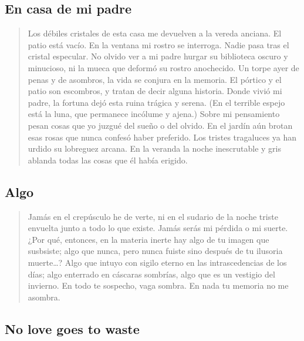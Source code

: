 \documentclass[a4paper, 12pt]{article}
\begin{document}
\pagebreak
\subsection{En casa de mi padre}

\begin{verse}
   Los débiles cristales de esta casa 
   me devuelven a la vereda anciana.
   El patio está vacío. En la ventana 
   mi rostro se interroga. Nadie pasa 
   tras el cristal especular. No olvido 
   ver a mi padre hurgar su biblioteca
   oscuro y minucioso, ni la mueca 
   que deformó su rostro anochecido.
   Un torpe ayer de penas y de asombros,
   la vida se conjura en la memoria.
   El pórtico y el patio son escombros,
   y tratan de decir alguna historia.
   Donde vivió mi padre, la fortuna 
   dejó esta ruina trágica y serena.
   (En el terrible espejo está la luna,
   que permanece incólume y ajena.)
   Sobre mi pensamiento pesan cosas 
   que yo juzgué del sueño o del olvido.
   En el jardín aún brotan esas rosas 
   que nunca confesó haber preferido.
   Los tristes tragaluces ya han urdido
   su lobreguez arcana. En la veranda 
   la noche inescrutable y gris ablanda 
   todas las cosas que él había erigido.
\end{verse}

\pagebreak
\subsection{Algo}

\begin{verse}
    
Jamás en el crepúsculo he de verte,
ni en el sudario de la noche triste 
envuelta junto a todo lo que existe.
Jamás serás mi pérdida o mi suerte.
¿Por qué, entonces, en la materia inerte 
hay algo de tu imagen que susbsiste;
algo que nunca, pero nunca fuiste 
sino después de tu ilusoria muerte\ldots?
Algo que intuyo con sigilo eterno
en las intrascedencias de los días;
algo enterrado en cáscaras sombrías,
algo que es un vestigio del invierno.
En todo te sospecho, vaga sombra.
En nada tu memoria no me asombra.


\end{verse}

\pagebreak
\subsection{No love goes to waste}
~ 
\end{document}
